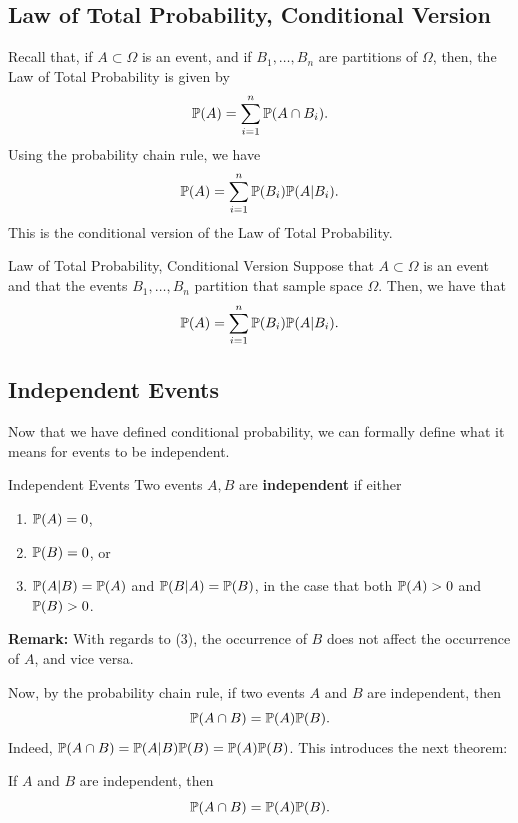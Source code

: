 \subsection{Law of Total Probability, Conditional Version}
Recall that, if $A \subset \Omega$ is an event, and if $B_1, \dots, B_n$ are partitions of $\Omega$, then, the Law of Total Probability is given by  
\[\mathbb{P}(A) = \sum_{i = 1}^{n} \mathbb{P}(A \cap B_i).\]
Using the probability chain rule, we have
\[\mathbb{P}(A) = \sum_{i = 1}^{n} \mathbb{P}(B_i) \mathbb{P}(A | B_i).\]
This is the conditional version of the Law of Total Probability.
\begin{theorem}{Law of Total Probability, Conditional Version}{}
    Suppose that $A \subset \Omega$ is an event and that the events $B_1, \dots, B_n$ partition that sample space $\Omega$. Then, we have that 
    \[\mathbb{P}(A) = \sum_{i = 1}^{n} \mathbb{P}(B_i) \mathbb{P}(A | B_i).\]
\end{theorem}

\subsection{Independent Events}
Now that we have defined conditional probability, we can formally define what it means for events to be independent. 
\begin{definition}{Independent Events}{}
    Two events $A, B$ are \textbf{independent} if either 
    \begin{enumerate}
        \item $\mathbb{P}(A) = 0$, 
        \item $\mathbb{P}(B) = 0$, or 
        \item $\mathbb{P}(A | B) = \mathbb{P}(A)$ and $\mathbb{P}(B | A) = \mathbb{P}(B)$, in the case that both $\mathbb{P}(A) > 0$ and $\mathbb{P}(B) > 0$.
    \end{enumerate}
\end{definition}
\textbf{Remark:} With regards to (3), the occurrence of $B$ does not affect the occurrence of $A$, and vice versa. 

\bigskip 

Now, by the probability chain rule, if two events $A$ and $B$ are independent, then 
\[\mathbb{P}(A \cap B) = \mathbb{P}(A) \mathbb{P}(B).\]
Indeed, $\mathbb{P}(A \cap B) = \mathbb{P}(A | B) \mathbb{P}(B) = \mathbb{P}(A) \mathbb{P}(B)$. This introduces the next theorem: 
\begin{theorem}{}{}
    If $A$ and $B$ are independent, then 
    \[\mathbb{P}(A \cap B) = \mathbb{P}(A) \mathbb{P}(B).\]
\end{theorem}

